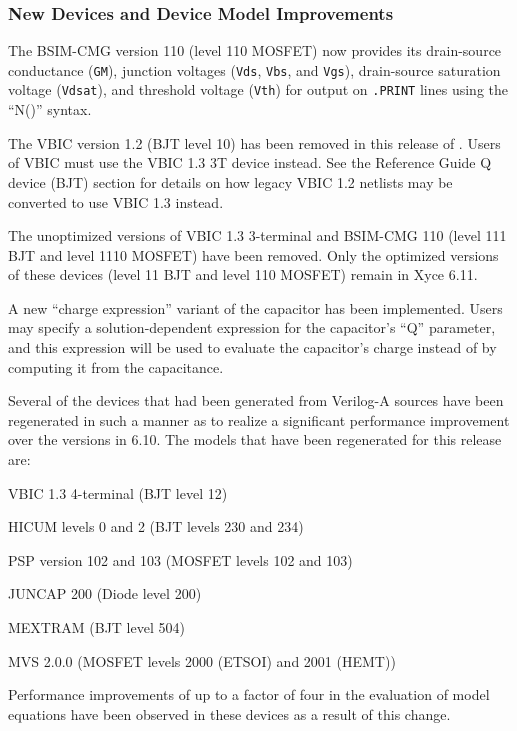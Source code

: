 \documentclass[letterpaper]{scrartcl}
\begin{document}
\subsubsection*{New Devices and Device Model Improvements}
\begin{XyceItemize}
\item The BSIM-CMG version 110 (level 110 MOSFET) now provides its
  drain-source conductance (\texttt{GM}), junction voltages
  (\texttt{Vds}, \texttt{Vbs}, and \texttt{Vgs}), drain-source
  saturation voltage (\texttt{Vdsat}), and threshold voltage
  (\texttt{Vth}) for output on \texttt{.PRINT} lines using the ``N()''
  syntax.
\item The VBIC version 1.2 (BJT level 10) has been removed in this
  release of \Xyce{}.  Users of VBIC must use the VBIC 1.3 3T
  device instead. See the \Xyce{} Reference Guide Q device (BJT)
  section for details on how legacy VBIC 1.2 netlists may be converted
  to use VBIC 1.3 instead.
\item The unoptimized versions of VBIC 1.3 3-terminal and BSIM-CMG 110
  (level 111 BJT and level 1110 MOSFET) have been removed.  Only the
  optimized versions of these devices (level 11 BJT and level 110
  MOSFET) remain in Xyce 6.11.
\item A new ``charge expression'' variant of the capacitor has been
  implemented.  Users may specify a solution-dependent expression for
  the capacitor's ``Q'' parameter, and this expression will be used to
  evaluate the capacitor's charge instead of by computing it from the
  capacitance.
\item Several of the devices that had been generated from Verilog-A
  sources have been regenerated in such a manner as to realize a
  significant performance improvement over the versions in \Xyce{} 6.10.
  The models that have been regenerated for this release are:
  \begin{XyceItemize}
  \item VBIC 1.3 4-terminal  (BJT level 12)
  \item HICUM levels 0 and 2 (BJT levels 230 and 234)
  \item PSP version 102 and 103 (MOSFET levels 102 and 103)
  \item JUNCAP 200 (Diode level 200)
  \item MEXTRAM (BJT level 504)
  \item MVS 2.0.0 (MOSFET levels 2000 (ETSOI) and 2001 (HEMT))
  \end{XyceItemize}
  Performance improvements of up to a factor of four in the evaluation
  of model equations have been observed in these devices as a result of this
  change.


\end{XyceItemize}
\end{document}
